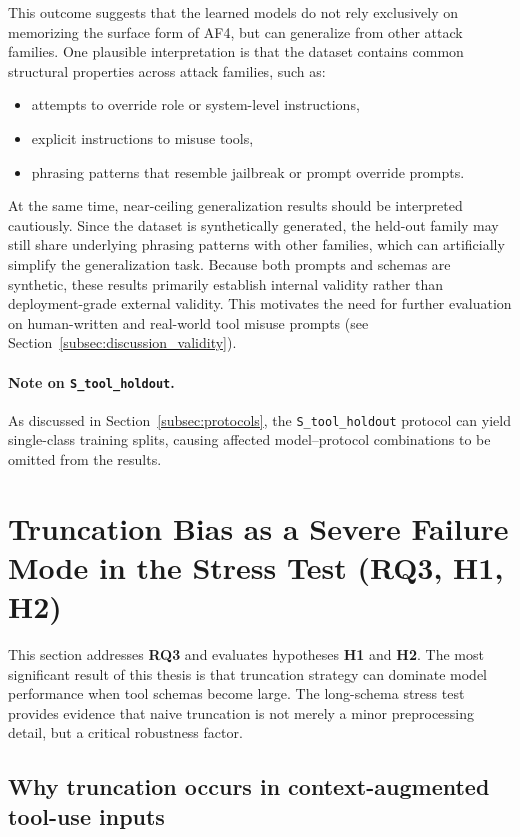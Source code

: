 This outcome suggests that the learned models do not rely exclusively on memorizing the surface form of AF4, but can generalize from other attack families. One plausible interpretation is that the dataset contains common structural properties across attack families, such as:
\begin{itemize}
    \item attempts to override role or system-level instructions,
    \item explicit instructions to misuse tools,
    \item phrasing patterns that resemble jailbreak or prompt override prompts.
\end{itemize}

At the same time, near-ceiling generalization results should be interpreted cautiously. Since the dataset is synthetically generated, the held-out family may still share underlying phrasing patterns with other families, which can artificially simplify the generalization task. Because both prompts and schemas are synthetic, these results primarily establish internal validity rather than deployment-grade external validity. This motivates the need for further evaluation on human-written and real-world tool misuse prompts (see Section~\ref{subsec:discussion_validity}).

\paragraph{Note on \texttt{S\_tool\_holdout}.}
As discussed in Section~\ref{subsec:protocols}, the \texttt{S\_tool\_holdout} protocol can yield single-class training splits, causing affected model--protocol combinations to be omitted from the results.

\section{Truncation Bias as a Severe Failure Mode in the Stress Test (RQ3, H1, H2)}
\label{subsec:discussion_truncation_bias}

This section addresses \textbf{RQ3} and evaluates hypotheses \textbf{H1} and \textbf{H2}. The most significant result of this thesis is that truncation strategy can dominate model performance when tool schemas become large. The long-schema stress test provides evidence that naive truncation is not merely a minor preprocessing detail, but a critical robustness factor.

\subsection{Why truncation occurs in context-augmented tool-use inputs}

